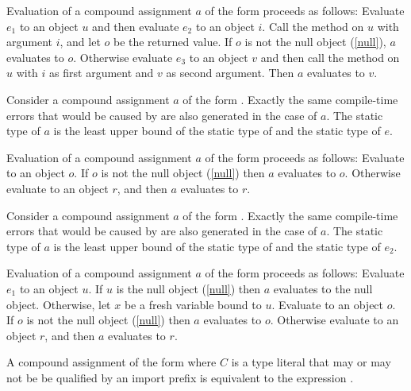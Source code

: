 \documentclass[makeidx]{article}
\begin{document}
\LMHash{}%
Evaluation of a compound assignment $a$ of the form 
proceeds as follows:
Evaluate $e_1$ to an object $u$ and then evaluate $e_2$ to an object $i$.
Call the \code{[]} method on $u$ with argument $i$, and let $o$ be the returned value.
If $o$ is not the null object (\ref{null}), $a$ evaluates to $o$.
Otherwise evaluate $e_3$ to an object $v$
and then call the \code{[]=} method on $u$ with $i$ as first argument and $v$ as second argument.
Then $a$ evaluates to $v$.

\LMHash{}%
Consider a compound assignment $a$ of the form .
Exactly the same compile-time errors that would be caused by  are also generated in the case of $a$.
The static type of $a$ is the least upper bound of the static type of  and the static type of $e$.

\LMHash{}%
Evaluation of a compound assignment $a$ of the form 
proceeds as follows:
Evaluate  to an object $o$.
If $o$ is not the null object (\ref{null}) then $a$ evaluates to $o$.
Otherwise evaluate  to an object $r$,
and then $a$ evaluates to $r$.

\LMHash{}%
Consider a compound assignment $a$ of the form .
Exactly the same compile-time errors that would be caused by  are also generated in the case of $a$.
The static type of $a$ is the least upper bound of the static type of  and the static type of $e_2$.

\LMHash{}%
Evaluation of a compound assignment $a$ of the form 
proceeds as follows:
Evaluate $e_1$ to an object $u$.
If $u$ is the null object (\ref{null}) then $a$ evaluates to the null object.
Otherwise, let $x$ be a fresh variable bound to $u$.
Evaluate  to an object $o$.
If $o$ is not the null object (\ref{null}) then $a$ evaluates to $o$.
Otherwise evaluate  to an object $r$,
and then $a$ evaluates to $r$.

\LMHash{}%
A compound assignment of the form 
where $C$ is a type literal
that may or may not be be qualified by an import prefix
is equivalent to the expression .
\end{document}
